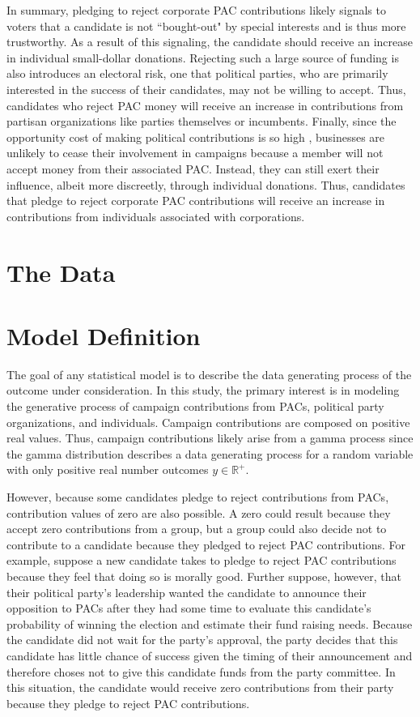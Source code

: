 \documentclass[12pt]{article}
\begin{document}
 In summary, pledging to reject corporate PAC contributions likely signals to voters that a candidate is not ``bought-out" by special interests and is thus more trustworthy. As a result of this signaling, the candidate should receive an increase in individual small-dollar donations. Rejecting such a large source of funding is also introduces an electoral risk, one that political parties, who are primarily interested in the success of their candidates, may not be willing to accept. Thus, candidates who reject PAC money will receive an increase in contributions from partisan organizations like parties themselves or incumbents. Finally, since the opportunity cost of making political contributions is so high \citep{grier_committee_1991}, businesses are unlikely to cease their involvement in campaigns because a member will not accept money from their associated PAC. Instead, they can still exert their influence, albeit more discreetly, through individual donations. Thus, candidates that pledge to reject corporate PAC contributions will receive an increase in contributions from individuals associated with corporations.


\section{The Data}




\section{Model Definition}

The goal of any statistical model is to describe the data generating process of the outcome under consideration. In this study, the primary interest is in modeling the generative process of campaign contributions from PACs, political party organizations, and individuals. Campaign contributions are composed on positive real values. Thus, campaign contributions likely arise from a gamma process since the gamma distribution describes a data generating process for a random variable with only positive real number outcomes $y \in  \mathbb{R}^+$. 

However, because some candidates pledge to reject contributions from PACs, contribution values of zero are also possible. A zero could result because they accept zero contributions from a group, but a group could also decide not to contribute to a candidate because they pledged to reject PAC contributions. For example, suppose a new candidate takes to pledge to reject PAC contributions because they feel that doing so is morally good. Further suppose, however, that their political party's leadership wanted the candidate to announce their opposition to PACs after they had some time to evaluate this candidate's probability of winning the election and estimate their fund raising needs. Because the candidate did not wait for the party's approval, the party decides that this candidate has little chance of success given the timing of their announcement and therefore choses not to give this candidate funds from the party committee. In this situation, the candidate would receive zero contributions from their party because they pledge to reject PAC contributions. 
\end{document}
